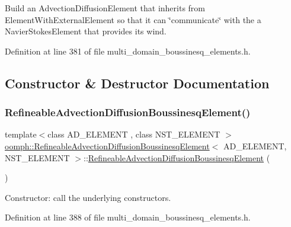 Build an Advection\+Diffusion\+Element that inherits from Element\+With\+External\+Element so that it can \char`\"{}communicate\char`\"{} with the a Navier\+Stokes\+Element that provides its wind. 

Definition at line 381 of file multi\+\_\+domain\+\_\+boussinesq\+\_\+elements.\+h.



\subsection{Constructor \& Destructor Documentation}
\mbox{\label{classoomph_1_1RefineableAdvectionDiffusionBoussinesqElement_a26f91df92dc910d525ec920b9d674046}} 
\subsubsection{\texorpdfstring{Refineable\+Advection\+Diffusion\+Boussinesq\+Element()}{RefineableAdvectionDiffusionBoussinesqElement()}}
{\footnotesize\ttfamily template$<$class A\+D\+\_\+\+E\+L\+E\+M\+E\+NT , class N\+S\+T\+\_\+\+E\+L\+E\+M\+E\+NT $>$ \\
\hyperlink{classoomph_1_1RefineableAdvectionDiffusionBoussinesqElement}{oomph\+::\+Refineable\+Advection\+Diffusion\+Boussinesq\+Element}$<$ A\+D\+\_\+\+E\+L\+E\+M\+E\+NT, N\+S\+T\+\_\+\+E\+L\+E\+M\+E\+NT $>$\+::\hyperlink{classoomph_1_1RefineableAdvectionDiffusionBoussinesqElement}{Refineable\+Advection\+Diffusion\+Boussinesq\+Element} (\begin{DoxyParamCaption}{ }\end{DoxyParamCaption})\hspace{0.3cm}{\ttfamily [inline]}}



Constructor\+: call the underlying constructors. 



Definition at line 388 of file multi\+\_\+domain\+\_\+boussinesq\+\_\+elements.\+h.



